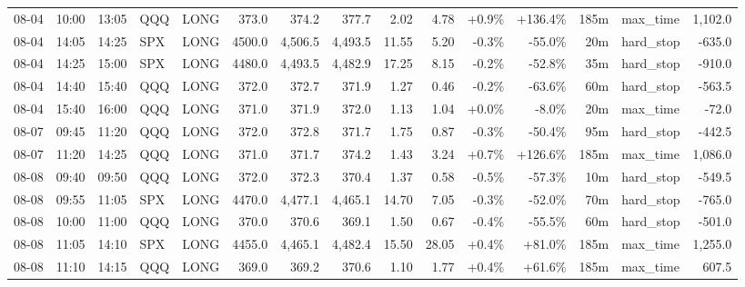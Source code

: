 \documentclass[11pt,a4paper,twoside]{article}
\begin{document}
\begin{landscape}
\begin{center}
\begin{longtable}{>{\color{txtmain}}l l l l l r r r r r r r r >{\color{txtmain}}l r}
08-04 & 10:00 & 13:05 & QQQ & LONG & 373.0 & 374.2 & 377.7 & 2.02 & 4.78 & \textcolor{wingreen}{+0.9\%} & \textcolor{wingreen}{+136.4\%} & 185m & max\_time & \textcolor{wingreen}{1,102.0} \\
08-04 & 14:05 & 14:25 & SPX & LONG & 4500.0 & 4,506.5 & 4,493.5 & 11.55 & 5.20 & \textcolor{lossred}{-0.3\%} & \textcolor{lossred}{-55.0\%} & 20m & hard\_stop & \textcolor{lossred}{-635.0} \\
08-04 & 14:25 & 15:00 & SPX & LONG & 4480.0 & 4,493.5 & 4,482.9 & 17.25 & 8.15 & \textcolor{lossred}{-0.2\%} & \textcolor{lossred}{-52.8\%} & 35m & hard\_stop & \textcolor{lossred}{-910.0} \\
08-04 & 14:40 & 15:40 & QQQ & LONG & 372.0 & 372.7 & 371.9 & 1.27 & 0.46 & \textcolor{lossred}{-0.2\%} & \textcolor{lossred}{-63.6\%} & 60m & hard\_stop & \textcolor{lossred}{-563.5} \\
08-04 & 15:40 & 16:00 & QQQ & LONG & 371.0 & 371.9 & 372.0 & 1.13 & 1.04 & \textcolor{wingreen}{+0.0\%} & \textcolor{lossred}{-8.0\%} & 20m & max\_time & \textcolor{lossred}{-72.0} \\
08-07 & 09:45 & 11:20 & QQQ & LONG & 372.0 & 372.8 & 371.7 & 1.75 & 0.87 & \textcolor{lossred}{-0.3\%} & \textcolor{lossred}{-50.4\%} & 95m & hard\_stop & \textcolor{lossred}{-442.5} \\
08-07 & 11:20 & 14:25 & QQQ & LONG & 371.0 & 371.7 & 374.2 & 1.43 & 3.24 & \textcolor{wingreen}{+0.7\%} & \textcolor{wingreen}{+126.6\%} & 185m & max\_time & \textcolor{wingreen}{1,086.0} \\
08-08 & 09:40 & 09:50 & QQQ & LONG & 372.0 & 372.3 & 370.4 & 1.37 & 0.58 & \textcolor{lossred}{-0.5\%} & \textcolor{lossred}{-57.3\%} & 10m & hard\_stop & \textcolor{lossred}{-549.5} \\
08-08 & 09:55 & 11:05 & SPX & LONG & 4470.0 & 4,477.1 & 4,465.1 & 14.70 & 7.05 & \textcolor{lossred}{-0.3\%} & \textcolor{lossred}{-52.0\%} & 70m & hard\_stop & \textcolor{lossred}{-765.0} \\
08-08 & 10:00 & 11:00 & QQQ & LONG & 370.0 & 370.6 & 369.1 & 1.50 & 0.67 & \textcolor{lossred}{-0.4\%} & \textcolor{lossred}{-55.5\%} & 60m & hard\_stop & \textcolor{lossred}{-501.0} \\
08-08 & 11:05 & 14:10 & SPX & LONG & 4455.0 & 4,465.1 & 4,482.4 & 15.50 & 28.05 & \textcolor{wingreen}{+0.4\%} & \textcolor{wingreen}{+81.0\%} & 185m & max\_time & \textcolor{wingreen}{1,255.0} \\
08-08 & 11:10 & 14:15 & QQQ & LONG & 369.0 & 369.2 & 370.6 & 1.10 & 1.77 & \textcolor{wingreen}{+0.4\%} & \textcolor{wingreen}{+61.6\%} & 185m & max\_time & \textcolor{wingreen}{607.5} \\

\end{longtable}
\end{center}
\end{landscape}
\end{document}
